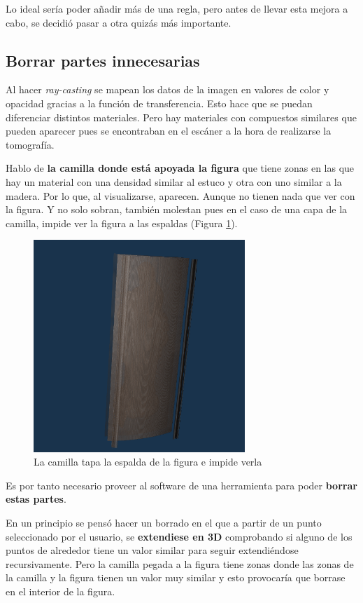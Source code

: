 Lo ideal sería poder añadir más de una regla, pero antes de llevar esta mejora a cabo, se decidió pasar a otra quizás más importante.

\subsection{Borrar partes innecesarias}

Al hacer \textit{ray-casting} se mapean los datos de la imagen en valores de color y opacidad gracias a la función de transferencia. Esto hace que se puedan diferenciar distintos materiales. Pero hay materiales con compuestos similares que pueden aparecer pues se encontraban en el escáner a la hora de realizarse la tomografía.

Hablo de \textbf{la camilla donde está apoyada la figura} que tiene zonas en las que hay un material con una densidad similar al estuco y otra con uno similar a la madera. Por lo que, al visualizarse, aparecen. Aunque no tienen nada que ver con la figura. Y no solo sobran, también molestan pues en el caso de una capa de la camilla, impide ver la figura a las espaldas (Figura \ref{fig:necesario_borrar}).

\begin{figure}[H]
	\centering
	\includegraphics[width=8cm]{imagenes/necesario_borrar}
	\caption{La camilla tapa la espalda de la figura e impide verla}
	\label{fig:necesario_borrar}
\end{figure}

Es por tanto necesario proveer al software de una herramienta para poder \textbf{borrar estas partes}.

En un principio se pensó hacer un borrado en el que a partir de un punto seleccionado por el usuario, se \textbf{extendiese en 3D} comprobando si alguno de los puntos de alrededor tiene un valor similar para seguir extendiéndose recursivamente. Pero la camilla pegada a la figura tiene zonas donde las zonas de la camilla y la figura tienen un valor muy similar y esto provocaría que borrase en el interior de la figura.


